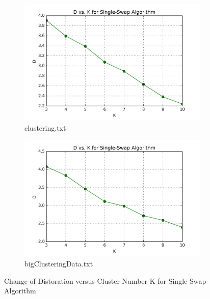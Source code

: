 \begin{figure}[H]
\centering
\centering
        \begin{subfigure}[b]{0.49\textwidth}
            \centering
            \includegraphics[width=\textwidth]{./figures/loss_clustering_singleSwap.png}
            \caption{clustering.txt}\label{fig:9a}
        \end{subfigure}
        \hfill
        \begin{subfigure}[b]{0.49\textwidth}  
            \centering 
            \includegraphics[width=\textwidth]{./figures/loss_bigClustering_singleSwap.png}
            \caption{bigClusteringData.txt}\label{fig:9b}
        \end{subfigure}
\caption{Change of Distoration versus Cluster Number K for Single-Swap Algorithm}
\label{fig:k-means-loss} 
\end{figure}

